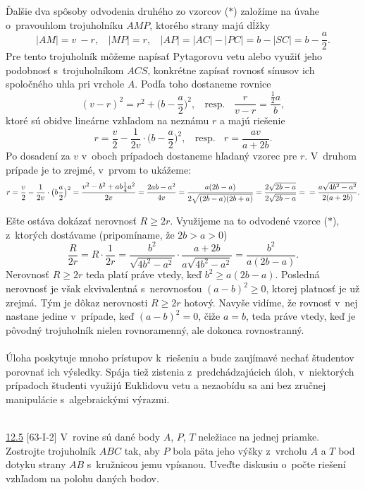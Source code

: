 Ďalšie dva spôsoby odvodenia druhého zo vzorcov ($\ast$) založíme na úvahe o~pravouhlom trojuholníku $AMP$, ktorého strany majú dĺžky
$$|AM| = v~-r, \ \ \ \ |MP| = r, \ \ \ \ |AP| = |AC| - |PC| = b - |SC| = b - \frac{a}{2}.$$
Pre tento trojuholník môžeme napísať Pytagorovu vetu alebo využiť jeho podobnosť s~trojuholníkom $ACS$, konkrétne zapísať rovnosť sínusov ich spoločného uhla pri vrchole $A$. Podľa toho dostaneme rovnice
$$(v - r)^2= r^2+\big(b -\frac{a}{2}\big)^2, \ \ \ \ \text{resp.} \ \ \ \ \frac{r}{v-r}=  \frac{\frac{1}{2}a}{b},$$
ktoré sú obidve lineárne vzhľadom na neznámu $r$ a majú riešenie
$$r = \frac{v}{2}-\frac{1}{2v}\cdot \big( b - \frac{a}{2} \big)^2, \ \ \ \ \text{resp.}\ \ \ \  r=
\frac{av}{a+2b}.$$
Po dosadení za $v$ v~oboch prípadoch dostaneme hľadaný vzorec pre $r$. V~druhom prípade
je to zrejmé, v~prvom to ukážeme:
$$r =\frac{v}{2}  - \frac{1}{2v} \cdot \big(b \frac{a}{2}\big)^2= \frac{v^2 - b^2 + ab \frac{1}{4}a^2}{2v}=\frac{2ab - a^2}{4v}=\frac{a(2b - a)}{2\sqrt{(2b -a)(2b + a)}}=\frac{2\sqrt{2b-a}}{2\sqrt{2b-a}}= \\ =\frac{a \sqrt{4b^2 -a^2}}{2(a + 2b)}.$$

Ešte ostáva dokázať nerovnosť $R \geq 2r$. Využijeme na to odvodené vzorce ($\ast$), z~ktorých dostávame (pripomíname, že $2b > a > 0$)
$$ \frac{R}{2r}= R \cdot \frac{1}{2r}=\frac{b^2}{\sqrt{4b^2-a^2}}\cdot \frac{a+2b}{a \sqrt{4b^2-a^2}}=\frac{b^2}{a(2b-a)}.$$
Nerovnosť $R \geq 2r$ teda platí práve vtedy, keď $b^2\geq a(2b -a)$. Posledná nerovnosť je však ekvivalentná s~nerovnosťou $(a - b)^2\geq 0$, ktorej platnosť je už zrejmá. Tým je dôkaz nerovnosti $R \geq 2r$ hotový. Navyše vidíme, že rovnosť v~nej nastane jedine v~prípade, keď $(a - b)^2 = 0$, čiže $a = b$, teda práve vtedy, keď je pôvodný trojuholník nielen rovnoramenný, ale dokonca rovnostranný.\\
\\
\kom Úloha poskytuje mnoho prístupov k~riešeniu a bude zaujímavé nechať študentov porovnať ich výsledky. Spája tiež zistenia z~predchádzajúcich úloh, v~niektorých prípadoch študenti využijú Euklidovu vetu a nezaobídu sa ani bez zručnej manipulácie s~algebraickými výrazmi. \\
\\
\begin{tcolorbox}[breakable,notitle,boxrule=0pt,colback=light-gray,colframe=light-gray]\ul{12.5} [63-I-2]  V~rovine sú dané body $A$, $P$, $T$ neležiace na jednej priamke. Zostrojte trojuholník $ABC$ tak, aby $P$ bola päta jeho výšky z~vrcholu $A$ a $T$ bod dotyku strany $AB$ s~kružnicou jemu vpísanou. Uveďte diskusiu o~počte riešení vzhľadom na polohu daných bodov.

\end{tcolorbox}

